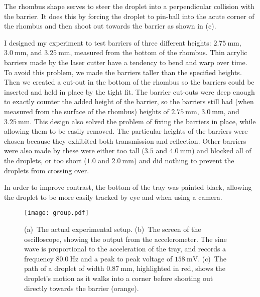 The rhombus shape serves to steer the droplet into a perpendicular collision with the barrier. It does this by forcing the droplet to pin-ball into the acute corner of the rhombus and then shoot out towards the barrier as shown in (c).

I designed my experiment to test barriers of three different heights: $2.75~\mathrm{mm}$, $3.0~\mathrm{mm}$, and $3.25~\mathrm{mm}$, measured from the bottom of the rhombus. Thin acrylic barriers made by the laser cutter have a tendency to bend and warp over time. To avoid this problem, we made the barriers taller than the specified heights. Then we created a cut-out in the bottom of the rhombus so the barriers could be inserted and held in place by the tight fit. The barrier cut-outs were deep enough to exactly counter the added height of the barrier, so the barriers still had (when measured from the surface of the rhombus) heights of $2.75~\mathrm{mm}$, $3.0~\mathrm{mm}$, and $3.25~\mathrm{mm}$. This design also solved the problem of fixing the barriers in place, while allowing them to be easily removed. The particular heights of the barriers were chosen because they exhibited both transmission and reflection. Other barriers were also made by these were either too tall ($3.5$ and $4.0~\mathrm{mm}$) and blocked all of the droplets, or too short ($1.0$ and $2.0~\mathrm{mm}$) and did nothing to prevent the droplets from crossing over.

In order to improve contrast, the bottom of the tray was painted black, allowing the droplet to be more easily tracked by eye and when using a camera.

\begin{figure}[h!]
	\centering
	\texttt{[image: group.pdf]}
	\caption{(a)~The actual experimental setup. 
	(b)~The screen of the oscilloscope, showing the output from the accelerometer. The sine wave is proportional to the acceleration of the tray, and records a frequency $80.0~\mathrm{Hz}$ and a peak to peak voltage of $158~\mathrm{mV}$. 
	(c)~The path of a droplet of width $0.87~\mathrm{mm}$, highlighted in red, shows the droplet's motion as it walks into a corner before shooting out directly towards the barrier (orange).}
	\label{group}
\end{figure}

